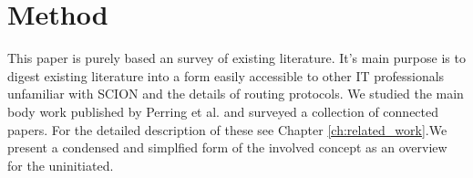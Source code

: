 \documentclass[../eva1_scion.tex]{subfiles}
\begin{document}
    \chapter{Method}\label{ch:method}

   This paper is purely based an survey of existing literature. It's main purpose is to digest existing literature into a form easily accessible to other IT professionals unfamiliar with SCION and the details of routing protocols. We studied the main body work published by Perring et al. and surveyed a collection of connected papers. For the detailed description of these see Chapter \ref{ch:related_work}.We present a condensed and simplfied form of the involved concept as an overview for the uninitiated.
\end{document}
